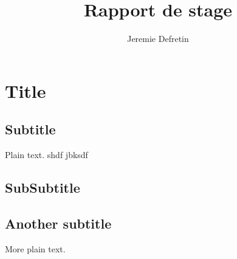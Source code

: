 \documentclass{article}
\title{Rapport de stage}
\author{Jeremie Defretin}
\begin{document}
 
\maketitle

\section{Title}

\subsection{Subtitle}

Plain text. shdf jbksdf

\subsection{SubSubtitle}


\subsection{Another subtitle}

More plain text.
\end{document}
